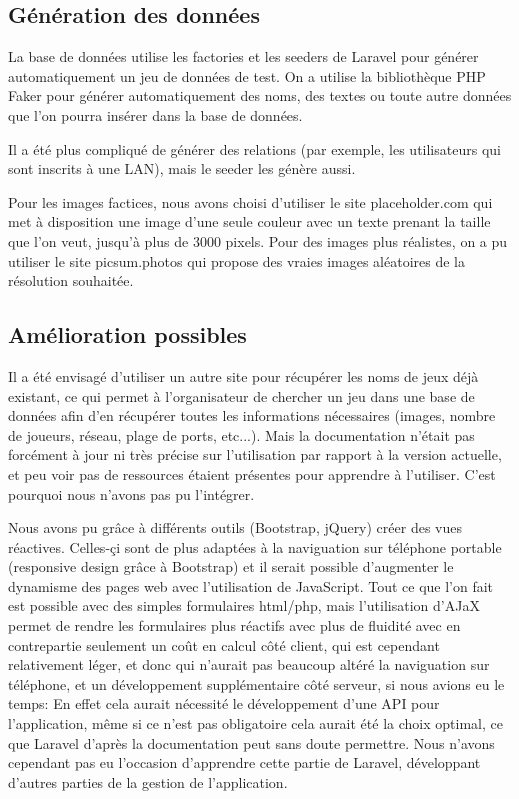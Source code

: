 \documentclass[12pt]{article}
\begin{document}
\subsection{Génération des données}

La base de données utilise les factories et les seeders de Laravel pour générer automatiquement un jeu de données de test. On a utilise la bibliothèque PHP Faker pour générer automatiquement des noms, des textes ou toute autre données que l'on pourra insérer dans la base de données.

Il a été plus compliqué de générer des relations (par exemple, les utilisateurs qui sont inscrits à une LAN), mais le seeder les génère aussi.

Pour les images factices, nous avons choisi d'utiliser le site placeholder.com qui met à disposition une image d'une seule couleur avec un texte prenant la taille que l'on veut, jusqu'à plus de 3000 pixels. Pour des images plus réalistes, on a pu utiliser le site picsum.photos qui propose des vraies images aléatoires de la résolution souhaitée.

\subsection{Amélioration possibles}

Il a été envisagé d'utiliser un autre site pour récupérer les noms de jeux déjà existant, ce qui permet à l'organisateur de chercher un jeu dans une base de données afin d'en récupérer toutes les informations nécessaires (images, nombre de joueurs, réseau, plage de ports, etc...). Mais la documentation n'était pas forcément à jour ni très précise sur l'utilisation par rapport à la version actuelle, et peu voir pas de ressources étaient présentes pour apprendre à l'utiliser. C'est pourquoi nous n'avons pas pu l'intégrer.

Nous avons pu grâce à différents outils (Bootstrap, jQuery) créer des vues réactives. Celles-çi sont de plus adaptées à la naviguation sur téléphone portable (responsive design grâce à Bootstrap) et il serait possible d'augmenter le dynamisme des pages web avec l'utilisation de JavaScript. Tout ce que l'on fait est possible avec des simples formulaires html/php, mais l'utilisation d'AJaX permet de rendre les formulaires plus réactifs avec plus de fluidité avec en contrepartie seulement un coût en calcul côté client, qui est cependant relativement léger, et donc qui n'aurait pas beaucoup altéré la naviguation sur téléphone, et un développement supplémentaire côté serveur, si nous avions eu le temps: En effet cela aurait nécessité le développement d'une API pour l'application, même si ce n'est pas obligatoire cela aurait été la choix optimal, ce que Laravel d'après la documentation peut sans doute permettre. Nous n'avons cependant pas eu l'occasion d'apprendre cette partie de Laravel, développant d'autres parties de la gestion de l'application.
\end{document}
